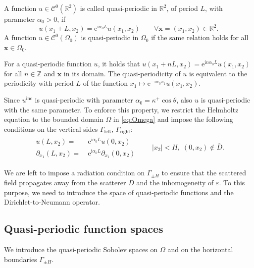\documentclass[a4paper,10pt]{article}
\newcommand{\IR}{{\mathbb R}}
\newcommand{\IZ}{{\mathbb Z}}
\newcommand{\bx}{{\mathbf x}}
\newcommand{\ri}{{\mathrm i}}
\newcommand{\re}{{\mathrm e}}
\newcommand{\inc}{{\mathrm{inc}}}
\newcommand{\dxo}{{\partial_{x_1}}}
\newcommand{\GpmH}{{\Gamma_{\pm H}}}
\newcommand{\Gleft}{\Gamma_{\mathrm{left}}}
\newcommand{\Gright}{\Gamma_{\mathrm{right}}}
\begin{document}
	\begin{defin}\label{def:QP}
		A function $u\in \mathcal{C}^0(\IR^2)$ is called quasi-periodic in $\IR^2$, of period $L$, with parameter $\alpha_0>0$, if
		\begin{equation*}
			u(x_1+L,x_2)=\re^{\ri\alpha_0 L}u(x_1,x_2) \qquad \forall \bx = (x_1,x_2) \in \IR^2.
		\end{equation*}
		A function $u\in \mathcal{C}^0(\Omega_0)$ is quasi-periodic in $\Omega_0$ if the same relation holds for all $\bx\in\Omega_0$.
	\end{defin} 
	For a quasi-periodic function $u$, it holds that 
	$u(x_1+nL,x_2)=\re^{\ri n\alpha_0 L}u(x_1,x_2)$ for all $n\in\IZ$ and $\bx$ in its domain.
	The quasi-periodicity of $u$ is equivalent to the periodicity with period $L$ of the function $x_1 \mapsto \re^{-\ri\alpha_0 x_1}u(x_1,x_2)$.
	
	Since $u^\inc$ is quasi-periodic with parameter $\alpha_0=\kappa^+\cos\theta$, also $u$ is quasi-periodic with the same parameter.
	To enforce this property, we restrict the Helmholtz equation to the bounded domain $\Omega$ in \eqref{eq:Omega} and impose the following conditions on the vertical sides $\Gleft$, $\Gright$:
	\begin{align*}%
		\begin{aligned}
			u(L,x_2) =&\ \re^{\ri\alpha_0 L}u(0,x_2) \\ %
			\dxo(L,x_2) =&\ \re^{\ri\alpha_0 L}\dxo(0,x_2) 
		\end{aligned}
		\qquad |x_2|<H, \; (0,x_2)\notin\overline D.
	\end{align*}
	
	We are left to impose a radiation condition on $\GpmH$ to ensure that the scattered field propagates away from the scatterer $D$ and the inhomogeneity of $\varepsilon$.
	To this purpose, we need to introduce the space of quasi-periodic functions and the Dirichlet-to-Neumann operator.
	
	\subsection{Quasi-periodic function spaces}
	We introduce the quasi-periodic Sobolev spaces on $\Omega$ and on the horizontal boundaries $\GpmH$.
	
\end{document}
